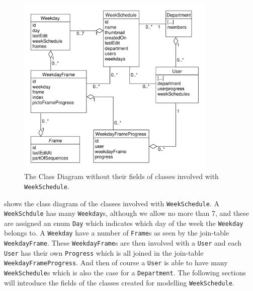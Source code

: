 \begin{figure}[!htb]
    \centering
        \includegraphics[width=0.85\textwidth]{figures/weekschedulemodel.pdf}
    \caption{The Class Diagram without their fields of classes involved with \texttt{WeekSchedule}.}\label{fig:weekscheduleclassdiagram}
\end{figure}

 shows the class diagram of the classes involved with \texttt{WeekSchedule}. 
A \texttt{WeekSchdule} has many \texttt{Weekday}s, although we allow no more than 7, and these are assigned an enum \texttt{Day} which indicates which day of the week the \texttt{Weekday} belongs to.
A \texttt{Weekday} have a number of \texttt{Frame}s as seen by the join-table \texttt{WeekdayFrame}.
These \texttt{WeekdayFrame}s are then involved with a \texttt{User} and each \texttt{User} has their own \texttt{Progress} which is all joined in the join-table \texttt{WeekdayFrameProgress}.
And then of course a \texttt{User} is able to have many \texttt{WeekSchedule}s which is also the case for a \texttt{Department}.
The following sections will introduce the fields of the classes created for modelling \texttt{WeekSchedule}.

